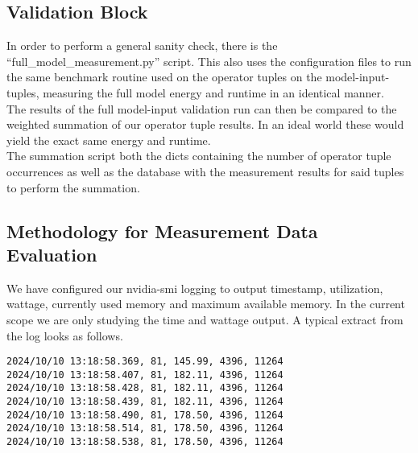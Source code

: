 \documentclass[conference]{IEEEtran}
\begin{document}
\subsection{Validation Block}
In order to perform a general sanity check, there is the “full\_model\_measurement.py” script. This also uses the configuration files to run the same benchmark routine used on the operator tuples on the model-input-tuples, measuring the full model energy and runtime in an identical manner. \\
The results of the full model-input validation run can then be compared to the weighted summation of our operator tuple results. In an ideal world these would yield the exact same energy and runtime. \\
The summation script both the dicts containing the number of operator tuple occurrences as well as the database with the measurement results for said tuples to perform the summation.

\subsection{Methodology for Measurement Data Evaluation}

We have configured our nvidia-smi logging to output timestamp, utilization, wattage, currently used memory and maximum available memory. In the current scope we are only studying the time and wattage output. A typical extract from the log looks as follows.


\begin{footnotesize} %
\begin{verbatim}
2024/10/10 13:18:58.369, 81, 145.99, 4396, 11264
2024/10/10 13:18:58.407, 81, 182.11, 4396, 11264
2024/10/10 13:18:58.428, 81, 182.11, 4396, 11264
2024/10/10 13:18:58.439, 81, 182.11, 4396, 11264
2024/10/10 13:18:58.490, 81, 178.50, 4396, 11264
2024/10/10 13:18:58.514, 81, 178.50, 4396, 11264
2024/10/10 13:18:58.538, 81, 178.50, 4396, 11264
\end{verbatim}
\end{footnotesize}
\end{document}
